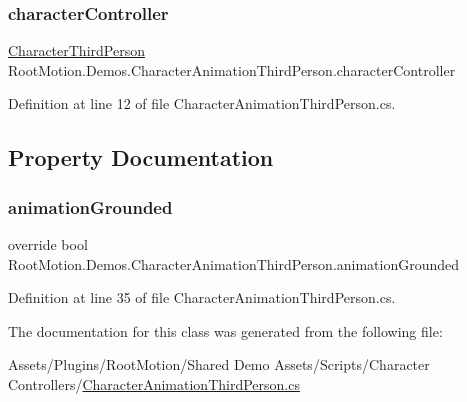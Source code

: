 \subsubsection{\texorpdfstring{character\+Controller}{characterController}}
{\footnotesize\ttfamily \mbox{\hyperlink{class_root_motion_1_1_demos_1_1_character_third_person}{Character\+Third\+Person}} Root\+Motion.\+Demos.\+Character\+Animation\+Third\+Person.\+character\+Controller}



Definition at line 12 of file Character\+Animation\+Third\+Person.\+cs.



\subsection{Property Documentation}
\mbox{\label{class_root_motion_1_1_demos_1_1_character_animation_third_person_a8edcce70454732442f54ae22ffb42f64}} 
\subsubsection{\texorpdfstring{animation\+Grounded}{animationGrounded}}
{\footnotesize\ttfamily override bool Root\+Motion.\+Demos.\+Character\+Animation\+Third\+Person.\+animation\+Grounded\hspace{0.3cm}{\ttfamily [get]}}



Definition at line 35 of file Character\+Animation\+Third\+Person.\+cs.



The documentation for this class was generated from the following file\+:\begin{DoxyCompactItemize}
\item 
Assets/\+Plugins/\+Root\+Motion/\+Shared Demo Assets/\+Scripts/\+Character Controllers/\mbox{\hyperlink{_character_animation_third_person_8cs}{Character\+Animation\+Third\+Person.\+cs}}\end{DoxyCompactItemize}
